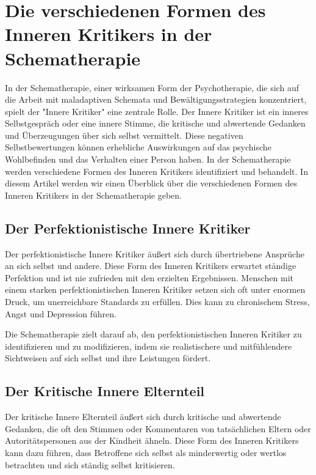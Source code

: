 \section{Die verschiedenen Formen des Inneren Kritikers in der Schematherapie}

In der Schematherapie, einer wirksamen Form der Psychotherapie, die sich auf die Arbeit mit maladaptiven Schemata und Bewältigungsstrategien konzentriert, spielt der "Innere Kritiker" eine zentrale Rolle. Der Innere Kritiker ist ein inneres Selbstgespräch oder eine innere Stimme, die kritische und abwertende Gedanken und Überzeugungen über sich selbst vermittelt. Diese negativen Selbstbewertungen können erhebliche Auswirkungen auf das psychische Wohlbefinden und das Verhalten einer Person haben. In der Schematherapie werden verschiedene Formen des Inneren Kritikers identifiziert und behandelt. In diesem Artikel werden wir einen Überblick über die verschiedenen Formen des Inneren Kritikers in der Schematherapie geben.

\subsection{Der Perfektionistische Innere Kritiker}

Der perfektionistische Innere Kritiker äußert sich durch übertriebene Ansprüche an sich selbst und andere. Diese Form des Inneren Kritikers erwartet ständige Perfektion und ist nie zufrieden mit den erzielten Ergebnissen. Menschen mit einem starken perfektionistischen Inneren Kritiker setzen sich oft unter enormen Druck, um unerreichbare Standards zu erfüllen. Dies kann zu chronischem Stress, Angst und Depression führen.

Die Schematherapie zielt darauf ab, den perfektionistischen Inneren Kritiker zu identifizieren und zu modifizieren, indem sie realistischere und mitfühlendere Sichtweisen auf sich selbst und ihre Leistungen fördert.

\subsection{Der Kritische Innere Elternteil}

Der kritische Innere Elternteil äußert sich durch kritische und abwertende Gedanken, die oft den Stimmen oder Kommentaren von tatsächlichen Eltern oder Autoritätspersonen aus der Kindheit ähneln. Diese Form des Inneren Kritikers kann dazu führen, dass Betroffene sich selbst als minderwertig oder wertlos betrachten und sich ständig selbst kritisieren.

